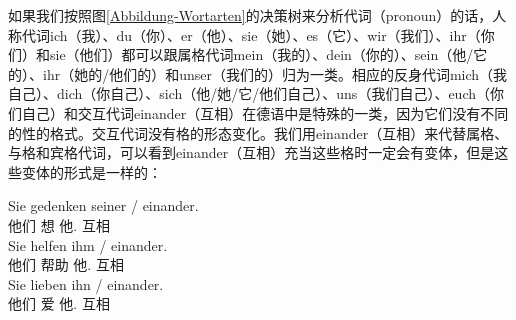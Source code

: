 如果我们按照图\ref{Abbildung-Wortarten}的决策树来分析代词（pronoun）的话，人称代词ich（我）、du（你）、er（他）、sie（她）、es（它）、wir（我们）、ihr（你们）和sie（他们）都可以跟属格代词mein（我的）、dein（你的）、sein（他/它的）、ihr（她的/他们的）和unser（我们的）归为一类。相应的反身代词mich（我自己）、dich（你自己）、sich（他/她/它/他们自己）、uns（我们自己）、euch（你们自己）和交互代词einander（互相）在德语中是特殊的一类，因为它们没有不同的性的格式。交互代词没有格的形态变化。我们用einander（互相）来代替属格、与格和宾格代词，可以看到einander（互相）充当这些格时一定会有变体，但是这些变体的形式是一样的：

\eal
\ex 
\gll Sie gedenken seiner / einander.\\
	 他们 想 他.\gen{} {} 互相\\
\ex 
\gll Sie helfen ihm / einander.\\
	 他们 帮助 他.\dat{} {} 互相\\
\ex 
\gll Sie lieben ihn / einander.\\
	 他们 爱 他.\acc{} {} 互相\\
\zl
%

